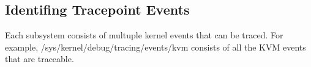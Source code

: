 \documentclass{report}
\begin{document}
\begin{spacing}{1.5}
{%

\leavevmode\newline
}

\subsection{Identifing Tracepoint Events}

{\large
Each subsystem consists of multuple kernel events that can be traced. For example, /sys/kernel/debug/tracing/events/kvm consists of all the KVM events that are traceable.
\newline
}


\end{spacing}
\end{document}
